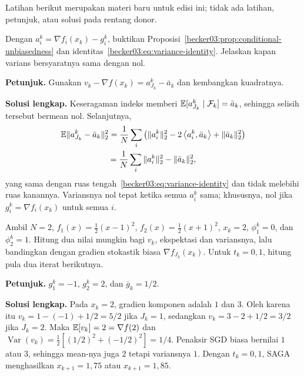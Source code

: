 Latihan berikut merupakan materi baru untuk edisi ini; tidak ada latihan,
petunjuk, atau solusi pada rentang donor.

\begin{exercise}
  \label{becker03:exercise:variance-identity}
  Dengan $a_i^k=\nabla f_i(x_k)-g_i^k$, buktikan
  Proposisi~\ref{becker03:prop:conditional-unbiasedness} dan
  identitas~\eqref{becker03:eq:variance-identity}. Jelaskan kapan varians
  bersyaratnya sama dengan nol.
\end{exercise}
\noindent\textbf{Petunjuk.}
Gunakan $v_k-\nabla f(x_k)=a_{J_k}^k-\bar a_k$ dan kembangkan kuadratnya.

\noindent\textbf{Solusi lengkap.}
Keseragaman indeks memberi
$\mathbb{E}[a_{J_k}^k\mid\mathcal F_k]=\bar a_k$, sehingga selisih tersebut
bermean nol. Selanjutnya,
\begin{multline*}
  \mathbb{E}\|a_{J_k}^k-\bar a_k\|_2^2
  =\frac1N\sum_i
    \left(\|a_i^k\|_2^2-2\left\langle a_i^k , \bar a_k\right\rangle
      +\|\bar a_k\|_2^2\right)\\
  =\frac1N\sum_i\|a_i^k\|_2^2-\|\bar a_k\|_2^2,
\end{multline*}
yang sama dengan ruas tengah~\eqref{becker03:eq:variance-identity} dan tidak
melebihi ruas kanannya. Variansnya nol tepat ketika semua $a_i^k$ sama;
khususnya, nol jika $g_i^k=\nabla f_i(x_k)$ untuk semua $i$.

\begin{exercise}
  \label{becker03:exercise:quadratic-step}
  Ambil $N=2$,
  $f_1(x)=\tfrac12(x-1)^2$, $f_2(x)=\tfrac12(x+1)^2$, $x_k=2$,
  $\phi_1^k=0$, dan $\phi_2^k=1$. Hitung dua nilai mungkin bagi $v_k$,
  ekspektasi dan variansnya, lalu bandingkan dengan gradien stokastik biasa
  $\nabla f_{J_k}(x_k)$. Untuk $t_k=0{,}1$, hitung pula dua iterat berikutnya.
\end{exercise}
\noindent\textbf{Petunjuk.}
$g_1^k=-1$, $g_2^k=2$, dan $\bar g_k=1/2$.

\noindent\textbf{Solusi lengkap.}
Pada $x_k=2$, gradien komponen adalah $1$ dan $3$. Oleh karena itu
$v_k=1-(-1)+1/2=5/2$ jika $J_k=1$, sedangkan
$v_k=3-2+1/2=3/2$ jika $J_k=2$. Maka
$\mathbb{E}[v_k]=2=\nabla f(2)$ dan
$\operatorname{Var}(v_k)=\tfrac12[(1/2)^2+(-1/2)^2]=1/4$.
Penaksir SGD biasa bernilai $1$ atau $3$, sehingga mean-nya juga $2$ tetapi
variansnya $1$. Dengan $t_k=0{,}1$, SAGA menghasilkan
$x_{k+1}=1{,}75$ atau $x_{k+1}=1{,}85$.
